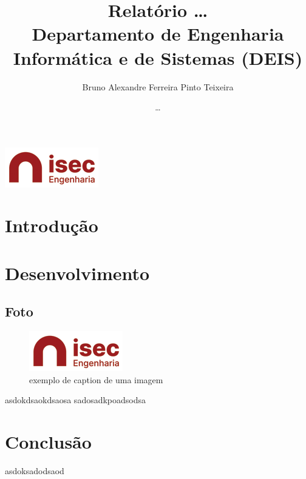\documentclass[letterpaper, 11pt]{article}
\author{Bruno Alexandre Ferreira Pinto Teixeira}
\date{\ldots{}}
\title{Relatório \ldots{}\\\medskip
\large Departamento de Engenharia Informática e de Sistemas (DEIS)}
\begin{document}
\maketitle
\begin{center}
\includegraphics[width=5 cm]{images/isec.png}
\end{center}

\clearpage
\tableofcontents
\clearpage

\listoffigures
\clearpage

\section{Introdução}
\label{sec:org4bf6b47}
\section{Desenvolvimento}
\label{sec:org22af79c}
\subsection{Foto}
\label{sec:org338014a}
\begin{figure}[htbp]
\centering
\includegraphics[width=.9\linewidth]{images/isec.png}
\caption{\label{fig:org266f93b}
exemplo de caption de uma imagem}
\end{figure}

asdokdsaokdsaosa
sadosadkpoadsodsa

\section{Conclusão}
\label{sec:org74a5d60}
asdoksadodsaod
\end{document}
